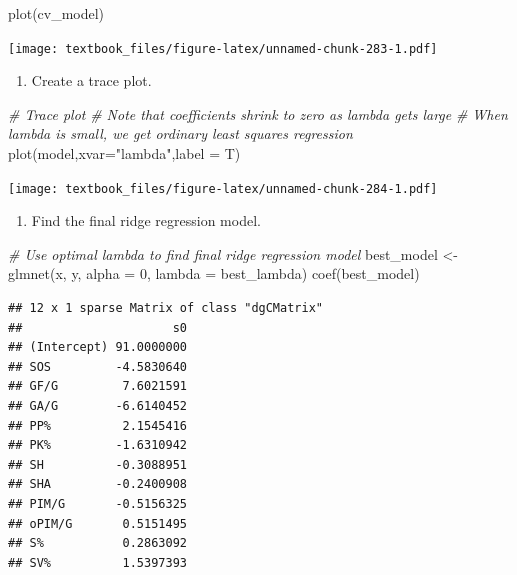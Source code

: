 \documentclass[
  11pt,
]{book}
\newenvironment{Shaded}{\begin{snugshade}}{\end{snugshade}}
\newcommand{\AttributeTok}[1]{\textcolor[rgb]{0.77,0.63,0.00}{#1}}
\newcommand{\CommentTok}[1]{\textcolor[rgb]{0.56,0.35,0.01}{\textit{#1}}}
\newcommand{\DecValTok}[1]{\textcolor[rgb]{0.00,0.00,0.81}{#1}}
\newcommand{\FunctionTok}[1]{\textcolor[rgb]{0.00,0.00,0.00}{#1}}
\newcommand{\NormalTok}[1]{#1}
\newcommand{\OtherTok}[1]{\textcolor[rgb]{0.56,0.35,0.01}{#1}}
\newcommand{\StringTok}[1]{\textcolor[rgb]{0.31,0.60,0.02}{#1}}
\providecommand{\tightlist}{%
  \setlength{\itemsep}{0pt}\setlength{\parskip}{0pt}}
\theoremstyle{definition}
\theoremstyle{definition}
\theoremstyle{definition}
\theoremstyle{definition}
\theoremstyle{remark}
\begin{document}
\begin{Shaded}
\begin{Highlighting}[]
\FunctionTok{plot}\NormalTok{(cv\_model)}
\end{Highlighting}
\end{Shaded}

\texttt{[image: textbook\_files/figure-latex/unnamed-chunk-283-1.pdf]}

\newpage

\begin{enumerate}
\def\labelenumi{(\alph{enumi})}
\setcounter{enumi}{3}
\tightlist
\item
  Create a trace plot.
\end{enumerate}

\begin{Shaded}
\begin{Highlighting}[]
\CommentTok{\# Trace plot}
\CommentTok{\# Note that coefficients shrink to zero as lambda gets large}
\CommentTok{\# When lambda is small, we get ordinary least squares regression}
\FunctionTok{plot}\NormalTok{(model,}\AttributeTok{xvar=}\StringTok{"lambda"}\NormalTok{,}\AttributeTok{label =}\NormalTok{ T) }
\end{Highlighting}
\end{Shaded}

\texttt{[image: textbook\_files/figure-latex/unnamed-chunk-284-1.pdf]}

\begin{enumerate}
\def\labelenumi{(\alph{enumi})}
\setcounter{enumi}{4}
\tightlist
\item
  Find the final ridge regression model.
\end{enumerate}

\begin{Shaded}
\begin{Highlighting}[]
\CommentTok{\# Use optimal lambda to find final ridge regression model}
\NormalTok{best\_model }\OtherTok{\textless{}{-}} \FunctionTok{glmnet}\NormalTok{(x, y, }\AttributeTok{alpha =} \DecValTok{0}\NormalTok{, }\AttributeTok{lambda =}\NormalTok{ best\_lambda)}
\FunctionTok{coef}\NormalTok{(best\_model)}
\end{Highlighting}
\end{Shaded}

\begin{verbatim}
## 12 x 1 sparse Matrix of class "dgCMatrix"
##                     s0
## (Intercept) 91.0000000
## SOS         -4.5830640
## GF/G         7.6021591
## GA/G        -6.6140452
## PP%          2.1545416
## PK%         -1.6310942
## SH          -0.3088951
## SHA         -0.2400908
## PIM/G       -0.5156325
## oPIM/G       0.5151495
## S%           0.2863092
## SV%          1.5397393
\end{verbatim}
\end{document}
